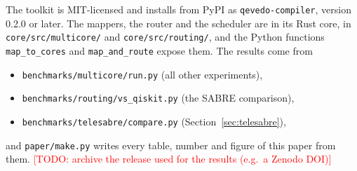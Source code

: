 \documentclass[11pt]{article}
\newcommand{\todo}[1]{\textcolor{red}{[TODO: #1]}}
\begin{document}
The toolkit is MIT-licensed and installs from PyPI as
\texttt{qevedo-compiler}, version 0.2.0 or later. The mappers, the router
and the scheduler are in its Rust core, in \nolinkurl{core/src/multicore/}
and \nolinkurl{core/src/routing/}, and the Python functions
\texttt{map\_to\_cores} and \texttt{map\_and\_route} expose them. The
results come from
\begin{itemize}
\item \nolinkurl{benchmarks/multicore/run.py} (all other experiments),
\item \nolinkurl{benchmarks/routing/vs_qiskit.py} (the SABRE comparison),
\item \nolinkurl{benchmarks/telesabre/compare.py} (Section~\ref{sec:telesabre}),
\end{itemize}
and \nolinkurl{paper/make.py} writes every table, number and figure of this
paper from them.
\todo{archive the release used for the results (e.g.\ a Zenodo DOI)}



\end{document}
